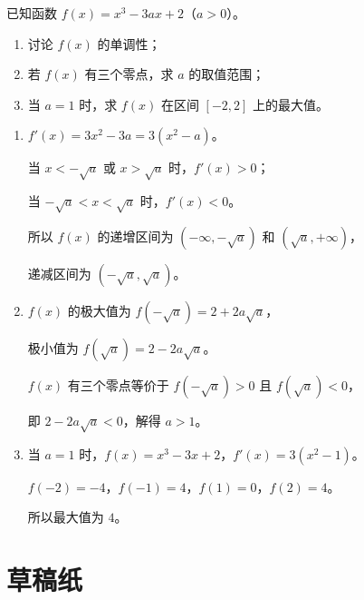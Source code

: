 \documentclass{exam-zh}
\begin{document}
\begin{problem}[points = 14]
  已知函数 $f(x) = x^3 - 3ax + 2$（$a > 0$）。

  \begin{enumerate}
    \item 讨论 $f(x)$ 的单调性；
    \item 若 $f(x)$ 有三个零点，求 $a$ 的取值范围；
    \item 当 $a = 1$ 时，求 $f(x)$ 在区间 $[-2, 2]$ 上的最大值。
  \end{enumerate}

  \begin{solution}
    \begin{enumerate}
      \item $f'(x) = 3x^2 - 3a = 3(x^2 - a)$。

      当 $x < -\sqrt{a}$ 或 $x > \sqrt{a}$ 时，$f'(x) > 0$；

      当 $-\sqrt{a} < x < \sqrt{a}$ 时，$f'(x) < 0$。

      所以 $f(x)$ 的递增区间为 $(-\infty, -\sqrt{a})$ 和 $(\sqrt{a}, +\infty)$，

      递减区间为 $(-\sqrt{a}, \sqrt{a})$。

      \item $f(x)$ 的极大值为 $f(-\sqrt{a}) = 2 + 2a\sqrt{a}$，

      极小值为 $f(\sqrt{a}) = 2 - 2a\sqrt{a}$。

      $f(x)$ 有三个零点等价于 $f(-\sqrt{a}) > 0$ 且 $f(\sqrt{a}) < 0$，

      即 $2 - 2a\sqrt{a} < 0$，解得 $a > 1$。

      \item 当 $a = 1$ 时，$f(x) = x^3 - 3x + 2$，$f'(x) = 3(x^2 - 1)$。

      $f(-2) = -4$，$f(-1) = 4$，$f(1) = 0$，$f(2) = 4$。

      所以最大值为 $4$。
    \end{enumerate}
  \end{solution}
\end{problem}


\newpage
\section*{草稿纸}

\draftpaper
\end{document}
